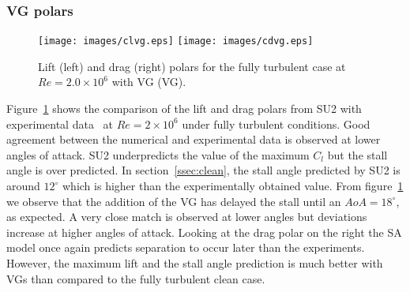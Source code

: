 \subsubsection{VG polars}\label{ssec:vg}
\begin{figure}[h]
    \centering
    \captionsetup{justification=centering}
    \texttt{[image: images/clvg.eps]}
    \texttt{[image: images/cdvg.eps]} 

    \caption{Lift (left) and drag (right) polars for the fully turbulent case at $Re=2.0\times10^6$ with VG (VG).}
   \label{fig:vgpolar}
\end{figure}
Figure~\ref{fig:vgpolar} shows the comparison of the lift and drag polars from SU2 with experimental data~\cite{baldacchino2018experimental} at $Re = 2\times10^6$ under fully turbulent conditions. Good agreement between the numerical and experimental data is observed at lower angles of attack. SU2 underpredicts the value of the maximum $C_l$ but the stall angle is over predicted. In section~\ref{ssec:clean}, the stall angle predicted by SU2 is around $12^{\circ}$ which is higher than the experimentally obtained value. From figure~\ref{fig:vgpolar} we observe that the addition of the VG has delayed the stall until an $AoA=18^{\circ}$, as expected. A very close match is observed at lower angles but deviations increase at higher angles of attack. Looking at the drag polar on the right the SA model once again predicts separation to occur later than the experiments. However, the maximum lift and the stall angle prediction is much better with VGs than compared to the fully turbulent clean case.

